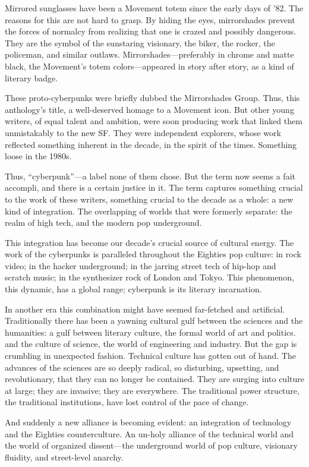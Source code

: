 Mirrored sunglasses have been a Movement totem since the early days of '82. The reasons for this are not hard to grasp. By hiding the eyes, mirrorshades prevent the forces of normalcy from realizing that one is crazed and possibly dangerous. They are the symbol of the sunstaring visionary, the biker, the rocker, the policeman, and similar outlaws. Mirrorshades---preferably in chrome and matte black, the Movement's totem colors---appeared in story after story, as a kind of literary badge.

These proto-cyberpunks were briefly dubbed the Mirrorshades Group. Thus, this anthology's title, a well-deserved homage to a Movement icon. But other young writers, of equal talent and ambition, were soon producing work that linked them unmistakably to the new SF. They were independent explorers, whose work reflected something inherent in the decade, in the spirit of the times. Something loose in the 1980s.

Thus, ``cyberpunk''---a label none of them chose. But the term now seems a fait accompli, and there is a certain justice in it. The term captures something crucial to the work of these writers, something crucial to the decade as a whole: a new kind of integration. The overlapping of worlds that were formerly separate: the realm of high tech, and the modern pop underground.

This integration has become our decade's crucial source of cultural energy. The work of the cyberpunks is paralleled throughout the Eighties pop culture: in rock video; in the hacker underground; in the jarring street tech of hip-hop and scratch music; in the synthesizer rock of London and Tokyo. This phenomenon, this dynamic, has a global range; cyberpunk is its literary incarnation.

In another era this combination might have seemed far-fetched and artificial. Traditionally there has been a yawning cultural gulf between the sciences and the humanities: a gulf between literary culture, the formal world of art and politics. and the culture of science, the world of engineering and industry.
But the gap is crumbling in unexpected fashion. Technical culture has gotten out of hand. The advances of the sciences are so deeply radical, so disturbing, upsetting, and revolutionary, that they can no longer be contained. They are surging into culture at large; they are invasive; they are everywhere. The traditional power structure, the traditional institutions, have lost control of the pace of change.

And suddenly a new alliance is becoming evident: an integration of technology and the Eighties counterculture. An un-holy alliance of the technical world and the world of organized dissent---the underground world of pop culture, visionary fluidity, and street-level anarchy.

